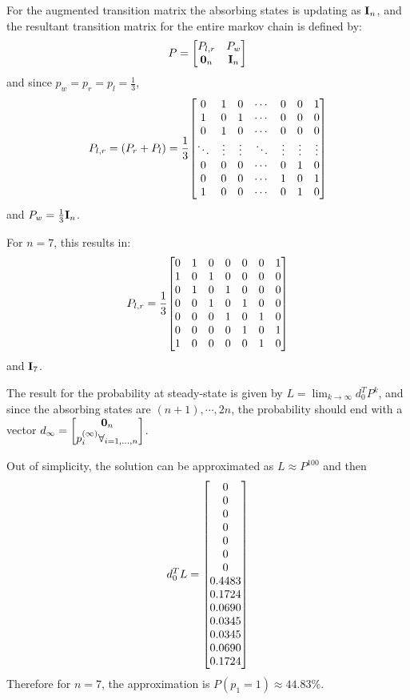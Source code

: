\documentclass[]{article}
\begin{document}
For the augmented transition matrix the absorbing states is updating as $\vb{I}_n$, and the resultant transition matrix for the entire markov chain is defined by:\[
    P = \mqty[
        P_{l,r} &  P_w\\
        \vb{0}_n & \vb{I}_n
    ]
\] and since $p_{w} = p_{r} = p_{l} = \frac{1}{3}$,
\[
    P_{l,r} = \qty(P_r + P_l) 
    = \frac{1}{3} \mqty[
        0 & 1 & 0 & \cdots & 0 & 0 & 1 \\
        1 & 0 & 1 & \cdots & 0 & 0 & 0 \\
        0 & 1 & 0 & \cdots & 0 & 0 & 0 \\
       \ddots &\vdots & \vdots & \ddots & \vdots & \vdots & \vdots \\
        0 & 0 & 0 & \cdots & 0 & 1 & 0 \\
        0 & 0 & 0 & \cdots & 1 & 0 & 1 \\
        1 & 0 & 0 & \cdots & 0 & 1 & 0
    ]
\] and $P_{w} = \frac{1}{3} \vb{I}_n$.

For $n = 7$, this results in:
\[
    P_{l,r} = \frac{1}{3} \mqty[
        0 & 1 & 0 & 0 & 0 & 0 & 1 \\
        1 & 0 & 1 & 0 & 0 & 0 & 0 \\
        0 & 1 & 0 & 1 & 0 & 0 & 0 \\
        0 & 0 & 1 & 0 & 1 & 0 & 0 \\
        0 & 0 & 0 & 1 & 0 & 1 & 0 \\
        0 & 0 & 0 & 0 & 1 & 0 & 1 \\
        1 & 0 & 0 & 0 & 0 & 1 & 0
    ]
\] and $\vb{I}_7$.

The result for the probability at steady-state is given by $L = \lim_{k\to \infty} d_0^T P^{k}$, and since the absorbing states are $(n+1),\cdots,2n$, the probability should end with a vector $d_{\infty} = \mqty[\vb{0}_n \\ p_{i}^{(\infty)} \forall_{i=1,\dots,n}]$.

Out of simplicity, the solution can be approximated as $L \approx P^{100}$ and then \[
    d_0^T L = 
    \mqty[  
        0      \\
        0      \\
        0      \\
        0      \\
        0      \\
        0      \\
        0      \\
        0.4483 \\
        0.1724 \\
        0.0690 \\
        0.0345 \\
        0.0345 \\
        0.0690 \\
        0.1724
    ]
\]
Therefore for $n=7$, the approximation is $P(p_1 = 1) \approx 44.83\%$.
\end{document}

